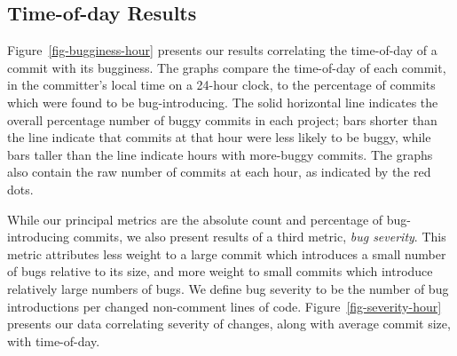 

\subsection{Time-of-day Results} 
\label{sec-time-of-day}
Figure~\ref{fig-bugginess-hour} 
presents our results correlating the time-of-day of a commit
with its bugginess.  
The graphs compare the time-of-day of each
commit, in the committer's local time on a 24-hour clock, to the
percentage of commits which were found to be bug-introducing. The
solid horizontal line indicates the overall percentage number of buggy commits in
each project; bars shorter than the line indicate that commits at that
hour were less likely to be buggy, while bars taller than the line
indicate hours with more-buggy commits. The graphs also contain the
raw number of commits at each hour, as indicated by the red dots.

While our principal metrics are the absolute count and percentage of
bug-introducing commits, we also present results of a third metric,
\emph{bug severity}. This metric attributes less weight to a large
commit which introduces a small number of bugs relative to its size,
and more weight to small commits which introduce relatively large
numbers of bugs. We define bug severity to be the number of bug
introductions per changed non-comment lines of
code. Figure~\ref{fig-severity-hour} presents our data correlating
severity of changes, along with average commit size, with time-of-day.

